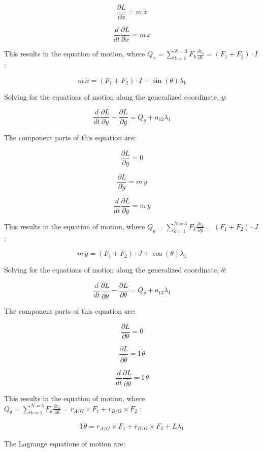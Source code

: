 \documentclass[12pt, letterpaper]{../assignment}
\begin{document}
$$ \frac{\partial L}{\partial \dot{x}}  =
m\,\dot{x} $$

$$ \frac{d}{d t} \frac{\partial L}{\partial \dot{x}} =
 m\,\ddot{x} $$

 This results in the equation of motion,
 where $Q_{x} = \sum_{k=1}^{N=3} F_{k} \frac{\partial r_k }{\partial x} = \left( F_1 + F_2 \right) \cdot I$ :
 
 $$ m\,\ddot{x} =
 \left( F_1 + F_2 \right) \cdot I -\sin \left(\theta \right) \lambda_1 $$

 Solving for the equations of motion along the generalized coordinate, $y$:

 $$ \frac{d}{d t} \frac{\partial L}{\partial \dot{y}} - \frac{\partial L}{\partial y} = 
 Q_{y} + a_{12} \lambda_1 $$
 
 The component parts of this equation are:
 
 
 $$ \frac{\partial L}{\partial y} = 0 $$
 
 $$ \frac{\partial L}{\partial \dot{y}}  =
 m\,\dot{y} $$
 
 $$ \frac{d}{d t} \frac{\partial L}{\partial \dot{y}} =
m\,\ddot{y} $$
 
This results in the equation of motion,
where $Q_{y} = \sum_{k=1}^{N=3} F_{k} \frac{\partial r_k }{\partial y} = \left( F_1 + F_2 \right) \cdot J$ :
  
$$ m\,\ddot{y} =
\left( F_1 + F_2 \right) \cdot J +\cos \left(\theta \right) \lambda_1 $$

Solving for the equations of motion along the generalized coordinate, $\theta$:

$$ \frac{d}{d t} \frac{\partial L}{\partial \dot{\theta}} - \frac{\partial L}{\partial \theta} = 
Q_{\theta} + a_{13} \lambda_1 $$

The component parts of this equation are:


$$ \frac{\partial L}{\partial \theta} = 0 $$

$$ \frac{\partial L}{\partial \dot{\theta}}  =
\textrm{I}\,\dot{\theta}  $$

$$ \frac{d}{d t} \frac{\partial L}{\partial \dot{\theta}} =
\textrm{I}\,\ddot{\theta}  $$

 This results in the equation of motion,
 where $Q_{\theta} = \sum_{k=1}^{N=3} F_{k} \frac{\partial r_k }{\partial \theta} = r_{A/G} \times F_1 + r_{B/G} \times F_2 $ :
 
 $$ \textrm{I}\,\ddot{\theta}  =
 r_{A/G} \times F_1 + r_{B/G} \times F_2 + L \lambda_1 $$

The Lagrange equations of motion are:
\end{document}
